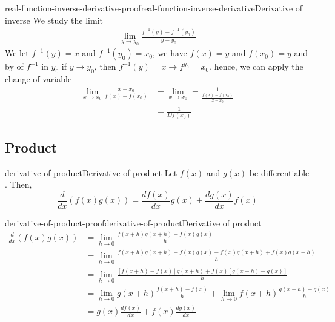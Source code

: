 \documentclass[preview]{standalone}
\begin{document}
\begin{snippetproof}{real-function-inverse-derivative-proof}{real-function-inverse-derivative}{Derivative of inverse}
    We study the limit
    \begin{align*}
        \lim_{y\to y_0} \frac{f^{-1}(y) - f^{-1}(y_0)}{y-y_0}
    \end{align*}
    We let \(f^{-1}(y) = x\) and \(f^{-1}(y_0) = x_0\),
    we have \(f(x) = y\) and \(f(x_0) = y\) and by \realcontinuous[continuity]
    of \(f^{-1}\) in \(y_0\) if \(y\to y_0\),
    then \(f^{-1}(y) = x \to f^{y_0} = x_0\).
    hence, we can apply the change of variable
    \begin{align*}
        \lim_{x\to x_0} \frac{x-x_0}{f(x) - f(x_0)}
        &= \lim_{x\to x_0} = \frac{1}{\frac{f(x) - f(x_0)}{x-x_0}} \\
        &= \frac{1}{Df(x_0)}
    \end{align*}
\end{snippetproof}

\subsection{Product}

\begin{snippetproposition}{derivative-of-product}{Derivative of product}
    Let \(f(x)\) and \(g(x)\) be differentiable \function[functions].
    Then, \[
        \frac{d}{dx}\left(f(x)g(x)\right) =\frac{df(x)}{dx}g(x) + \frac{dg(x)}{dx}f(x)
    \]
\end{snippetproposition}

\begin{snippetproof}{derivative-of-product-proof}{derivative-of-product}{Derivative of product}
    \begin{align*}
        \frac{d}{dx}\left(f(x)g(x)\right) &= \lim_{h \to 0}
        \frac{f(x+h)g(x+h) - f(x)g(x)}{h} \\
        &= \lim_{h \to 0} \frac{f(x+h)g(x+h) - f(x)g(x) -f(x)g(x+h) + f(x)g(x+h)}{h} \\
        &= \lim_{h \to 0} \frac{[f(x+h)-f(x)]g(x+h) + f(x)[g(x+h)-g(x)]}{h} \\
        &= \lim_{h \to 0} g(x+h)\frac{f(x+h)-f(x)}{h} + \lim_{h \to 0} f(x+h)\frac{g(x+h)-g(x)}{h} \\
        &= g(x) \frac{df(x)}{dx} + f(x) \frac{dg(x)}{dx}
    \end{align*}
\end{snippetproof}
\end{document}
